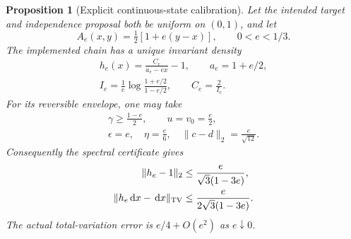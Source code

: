 \documentclass[pdflatex,iicol,sn-mathphys-ay]{sn-jnl}
\newtheorem{proposition}[theorem]{Proposition}
\theoremstyle{definition}\newtheorem{definition}[theorem]{Definition}
\theoremstyle{remark}\newtheorem{remark}[theorem]{Remark}
\numberwithin{equation}{section}
\newcommand{\dd}{\,\mathrm d}\newcommand{\cA}{c_\alpha}\newcommand{\sg}{\operatorname{sigmoid}}
\newcommand{\1}{\mathbf 1}
\begin{document}
\begin{proposition}[Explicit continuous-state calibration]\label{prop:continuouscertificate}
Let the intended target and independence proposal both be uniform on $(0,1)$, and let
\begin{equation}
 A_e(x,y)=\tfrac12[1+e(y-x)],\qquad 0<e<1/3.
 \label{eq:controlledacceptance}
\end{equation}
The implemented chain has a unique invariant density
\begin{equation}
\begin{gathered}
 h_e(x)=\frac{C_e}{a_e-ex}-1,\qquad a_e=1+e/2,\\
 I_e=\frac1e\log\frac{1+e/2}{1-e/2},\qquad C_e=\frac2{I_e}.
\end{gathered}\label{eq:controlleddensity}
\end{equation}
For its reversible envelope, one may take
\[
\begin{gathered}
 \gamma\ge\frac{1-e}{2},\qquad u=v_0=\frac e2,\\
 \epsilon=e,\quad \eta=\frac e6,\quad \|c-d\|_2=\frac e{\sqrt{12}}.
\end{gathered}
\]
Consequently the spectral certificate gives
\begin{equation}
\begin{aligned}
 \|h_e-1\|_2&\le\frac{e}{\sqrt3(1-3e)},\\
 \|h_e\dd x-\dd x\|_{\TV}&\le\frac{e}{2\sqrt3(1-3e)}.
\end{aligned}\label{eq:controlledbound}
\end{equation}
The actual total-variation error is $e/4+O(e^2)$ as $e\downarrow0$.
\end{proposition}
\end{document}
